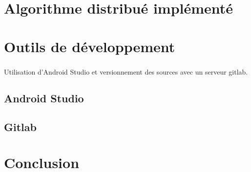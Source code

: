 \documentclass[a4paper,10pt]{report}
\begin{document}
    
    
    
    
  \paragraph{}

\chapter{Algorithme distribué implémenté}
\chapter{Outils de développement}
  \paragraph{}
  Utilisation d'Android Studio et versionnement des sources avec un serveur gitlab.
  \section{Android Studio}
  \section{Gitlab}
\chapter{Conclusion}
\end{document}
